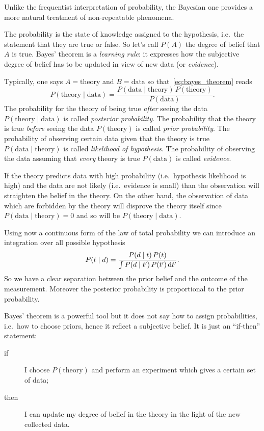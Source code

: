\documentclass[
	10pt,
	draft
]{scrreprt}
\begin{document}
Unlike the frequentist interpretation of probability, the Bayesian one provides a more natural treatment of non-repeatable phenomena.

The probability is the state of knowledge assigned to the hypothesis, i.e.~the statement that they are true or false.
So let's call $P(A)$ the degree of belief that $A$ is true.
Bayes' theorem is a \emph{learning rule}: it expresses how the subjective degree of belief has to be updated in view of new data (or \emph{evidence}).


Typically, one says $A = \text{theory}$ and $B = \text{data}$ so that~\eqref{eq:bayes_theorem} reads
\begin{equation}
P(\text{theory}\mid\text{data}) = \frac{P(\text{data}\mid \text{theory})\,P(\text{theory})}{P(\text{data})}.
\end{equation}
The probability for the theory of being true \emph{after} seeing the data $P(\text{theory}\mid\text{data})$ is called \emph{posterior probability}.
The probability that the theory is true \emph{before} seeing the data $P(\text{theory})$ is called \emph{prior probability}.
The probability of observing certain data given that the theory is true $P(\text{data}\mid \text{theory})$ is called \emph{likelihood of hypothesis}.
The probability of observing the data assuming that \emph{every} theory is true $P(\text{data})$ is called \emph{evidence}.


If the theory predicts data with high probability (i.e.~hypothesis likelihood is high) and the data are not likely (i.e.~evidence is small) than the observation will straighten the belief in the theory.
On the other hand, the observation of data which are forbidden by the theory will disprove the theory itself since $P(\text{data}\mid \text{theory}) = 0$ and so will be $P(\text{theory}\mid\text{data})$.


Using now a continuous form of the law of total probability we can introduce an integration over all possible hypothesis
\begin{equation}
P(t\mid d) = \frac{P(d\mid t)\,P(t)}{\int P(d\mid t')\,P(t')\mathop{}\!\mathrm{d} t'}.
\end{equation}
So we have a clear separation between the prior belief and the outcome of the measurement.
Moreover the posterior probability is proportional to the prior probability.


Bayes' theorem is a powerful tool but it does not say how to assign probabilities, i.e.~how to choose priors, hence it reflect a subjective belief.
It is just an ``if-then'' statement:
\begin{description}
\item[if]
I choose $P(\text{theory})$ and perform an experiment which gives a certain set of data;
\item[then]
I can update my degree of belief in the theory in the light of the new collected data.
\end{description}
\end{document}
